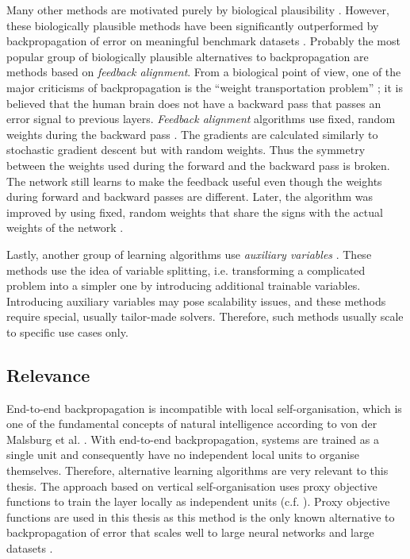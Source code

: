 Many other methods are motivated purely by biological plausibility .
However, these biologically plausible methods have been significantly outperformed by backpropagation of error on meaningful benchmark datasets .
Probably the most popular group of biologically plausible alternatives to backpropagation are methods based on \emph{feedback alignment}.
From a biological point of view, one of the major criticisms of backpropagation is the ``weight transportation problem'' ; it is believed that the human brain does not have a backward pass that passes an error signal to previous layers.
\emph{Feedback alignment} algorithms use fixed, random weights during the backward pass .
The gradients are calculated similarly to stochastic gradient descent but with random weights.
Thus the symmetry between the weights used during the forward and the backward pass is broken.
The network still learns to make the feedback useful even though the weights during forward and backward passes are different. 
Later, the algorithm was improved by using fixed, random weights that share the signs with the actual weights of the network .

Lastly, another group of learning algorithms use \emph{auxiliary variables} .
These methods use the idea of variable splitting, i.e. transforming a complicated problem into a simpler one by introducing additional trainable variables.
Introducing auxiliary variables may pose scalability issues, and these methods require special, usually tailor-made solvers.
Therefore, such methods usually scale to specific use cases only.

\subsection{Relevance}
End-to-end backpropagation is incompatible with local self-organisation, which is one of the fundamental concepts of natural intelligence according to von der Malsburg et al. .
With end-to-end backpropagation, systems are trained as a single unit and consequently have no independent local units to organise themselves.
Therefore, alternative learning algorithms are very relevant to this thesis.
The approach based on vertical self-organisation uses proxy objective functions to train the layer locally as independent units (c.f. ).
Proxy objective functions are used in this thesis as this method is the only known alternative to backpropagation of error that scales well to large neural networks and large datasets .

